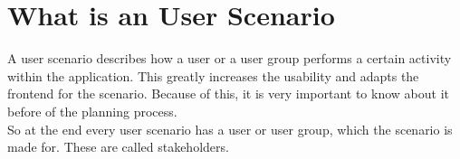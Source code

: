 \section{What is an User Scenario}
A user scenario describes how a user or a user group performs a certain activity within the application. This greatly increases the usability and adapts the frontend for the scenario. Because of this, it is very important to know about it before of the planning process.
\\[10pt]
So at the end every user scenario has a user or user group, which the scenario is made for. These are called stakeholders.